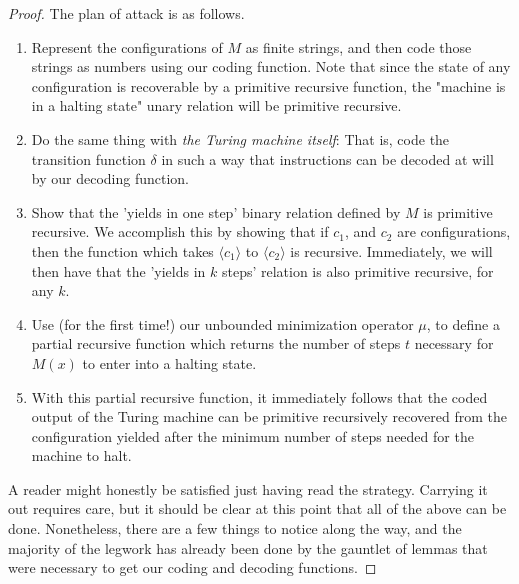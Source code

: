 \begin{proof}
    The plan of attack is as follows.
    \begin{enumerate}
        \item Represent the configurations of $M$ as finite strings, and then code those strings as numbers using our coding function. Note that since the state of any configuration is recoverable by a primitive recursive function, the "machine is in a halting state" unary relation will be primitive recursive. 
        \item Do the same thing with \textit{the Turing machine itself}: That is, code the transition function $\delta$ in such a way that instructions can be decoded at will by our decoding function.
        \item Show that the 'yields in one step' binary relation defined by $M$ is primitive recursive. We accomplish this by showing that if $c_1$, and $c_2$ are configurations, then the function which takes $\langle c_1 \rangle$ to $\langle c_2 \rangle$ is recursive. Immediately, we will then have that the 'yields in $k$ steps' relation is also primitive recursive, for any $k$.
        \item Use (for the first time!) our unbounded minimization operator $\mu$, to define a partial recursive function which returns the number of steps $t$ necessary for $M(x)$ to enter into a halting state.
        \item With this partial recursive function, it immediately follows that the coded output of the Turing machine can be primitive recursively recovered from the configuration yielded after the minimum number of steps needed for the machine to halt. 
    \end{enumerate}
    A reader might honestly be satisfied just having read the strategy. Carrying it out requires care, but it should be clear at this point that all of the above can be done. Nonetheless, there are a few things to notice along the way, and the majority of the legwork has already been done by the gauntlet of lemmas that were necessary to get our coding and decoding functions.

\end{proof}
